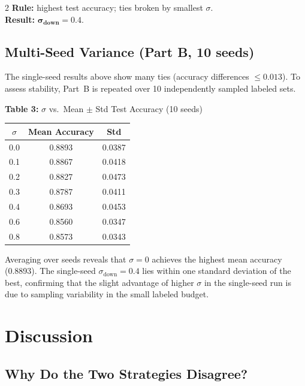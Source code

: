 \documentclass[10pt, letterpaper]{article}
\begin{document}
\begin{multicols}{2}
\textbf{Rule:} highest test accuracy; ties broken by smallest $\sigma$.\\
\textbf{Result:} $\boldsymbol{\sigma_{\text{down}} = 0.4}$.

\end{multicols}

\vspace{-0.5em}
\subsection{Multi-Seed Variance (Part B, 10 seeds)}

The single-seed results above show many ties (accuracy differences $\leq 0.013$). To assess stability, Part~B is repeated over 10 independently sampled labeled sets.

\begin{center}
\small
\textbf{Table 3:} $\sigma$ vs.\ Mean $\pm$ Std Test Accuracy (10 seeds)\\[3pt]
\begin{tabular}{ccc}
\toprule
$\sigma$ & Mean Accuracy & Std \\
\midrule
0.0 & 0.8893 & 0.0387 \\
0.1 & 0.8867 & 0.0418 \\
0.2 & 0.8827 & 0.0473 \\
0.3 & 0.8787 & 0.0411 \\
0.4 & 0.8693 & 0.0453 \\
0.6 & 0.8560 & 0.0347 \\
0.8 & 0.8573 & 0.0343 \\
\bottomrule
\end{tabular}
\end{center}

Averaging over seeds reveals that $\sigma{=}0$ achieves the highest mean accuracy (0.8893).
The single-seed $\sigma_{\text{down}}{=}0.4$ lies within one standard deviation of the best, confirming that the slight advantage of higher $\sigma$ in the single-seed run is due to sampling variability in the small labeled budget.

\section{Discussion}

\subsection{Why Do the Two Strategies Disagree?}
\end{document}
